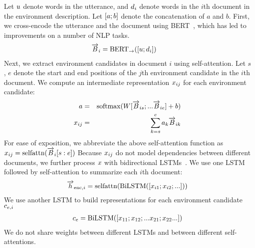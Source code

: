 \documentclass[11pt,a4paper]{article}
\begin{document}
Let ${u}$ denote words in the utterance, and ${d}_i$ denote words in the $i$th document in the environment description.
Let ${[a; b]}$ denote the concatenation of $a$ and $b$.
First, we cross-encode the utterance and the document using BERT~\citep{devlin2018bert}, which has led to improvements on a number of NLP tasks.
\begin{eqnarray}
{{\overrightarrow{{B}}}}_i &= {{\rm BERT}_{\rightarrow}}({[{u}; {d}_i]})
\label{eq:bertforward}
\end{eqnarray}
Next, we extract environment candidates in document $i$ using self-attention.
Let $s$, $e$ denote the start and end positions of the $j$th environment candidate in the $i$th document.
We compute an intermediate representation ${x}_{ij}$ for each environment candidate:
\begin{eqnarray}
a &=& {\rm softmax}(W [{{\overrightarrow{{B}}}}_{is}; ... {{\overrightarrow{{B}}}}_{ie}] + b)\\
{x}_{ij} &=& \sum_{k=s}^{e} a_k {{\overrightarrow{{B}}}}_{ik}
\end{eqnarray}
For ease of exposition, we abbreviate the above self-attention function as ${x}_{ij} = {\rm selfattn}({{\overrightarrow{{B}}}}_i[s:e])$
Because ${x}_{ij}$ do not model dependencies between different documents, we further process ${x}$ with bidirectional LSTMs~\citep{Hochreiter1997LongSM}.
We use one LSTM followed by self-attention to summarize each $i$th document:
\begin{eqnarray}
{\overrightarrow{{h}}}_{{\rm enc}, i} = {\rm selfattn}({\rm BiLSTM}({[{x}_{i1}; {x}_{i2}; ...]}))
\end{eqnarray}
We use another LSTM to build representations for each environment candidate ${c}_{{e}, i}$
\begin{eqnarray}
{c}_{e} = {\rm BiLSTM}({[x_{11}; x_{12}; ... x_{21}; x_{22} ...]})
\end{eqnarray}
We do not share weights between different LSTMs and between different self-attentions.
\end{document}
